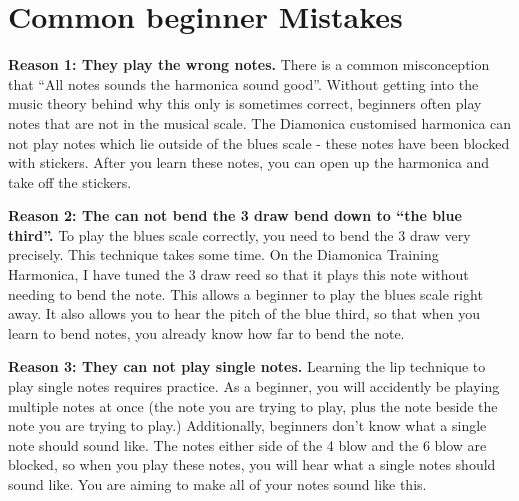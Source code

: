 
\section{Common beginner Mistakes}
\textbf{Reason 1: They play the wrong notes. }
There is a common misconception that “All notes sounds the harmonica sound good”. Without getting into the music theory behind why this only is sometimes correct, beginners often play notes that are not in the musical scale. The Diamonica customised harmonica can not play notes which lie outside of the blues scale - these notes have been blocked with stickers. After you learn these notes, you can open up the harmonica and take off the stickers.

\textbf{Reason 2: The can not bend the 3 draw bend down to “the blue third”.}
To play the blues scale correctly, you need to bend the 3 draw very precisely. This technique takes some time. On the Diamonica Training Harmonica, I have tuned the 3 draw reed so that it plays this note without needing to bend the note. This allows a beginner to play the blues scale right away. It also allows you to hear the pitch of the blue third, so that when you learn to bend notes, you already know how far to bend the note. 

\textbf{Reason 3: They can not play single notes.}
Learning the lip technique to play single notes requires practice. 
As a beginner, you will accidently be playing multiple notes at once (the note you are trying to play, plus the note beside the note you are trying to play.) Additionally, beginners don’t know what a single note should sound like. The notes either side of the 4 blow and the 6 blow are blocked, so when you play these notes, you will hear what a single notes should sound like. You are aiming to make all of your notes sound like this. 